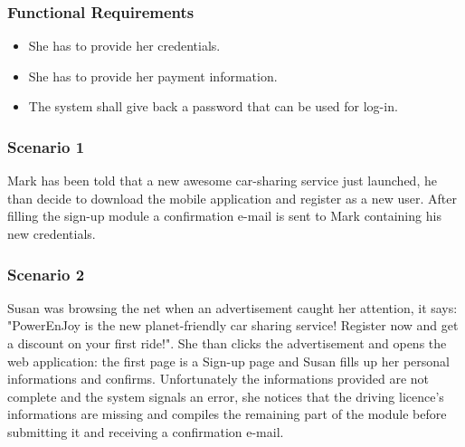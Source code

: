 \subsubsection{Functional Requirements}
\begin{itemize}
  \item She has to provide her credentials. 
  \item She has to provide her payment information.
  \item The system shall give back a password that can be used for log-in.
\end{itemize}
\subsubsection{Scenario 1}
Mark has been told that a new awesome car-sharing service just launched, he than decide to download the mobile application and register as a new user. After filling the sign-up module a confirmation e-mail is sent to Mark containing his new credentials.

\subsubsection{Scenario 2}
Susan was browsing the net when an advertisement caught her attention, it says: "PowerEnJoy is the new planet-friendly car sharing service! Register now and get a discount on your first ride!". She than clicks the advertisement and opens the web application: the first page is a Sign-up page and Susan fills up her personal informations and confirms. Unfortunately the informations provided are not complete and the system signals an error, she notices that the driving licence's informations are missing and compiles the remaining part of the module before submitting it and receiving a confirmation e-mail.

